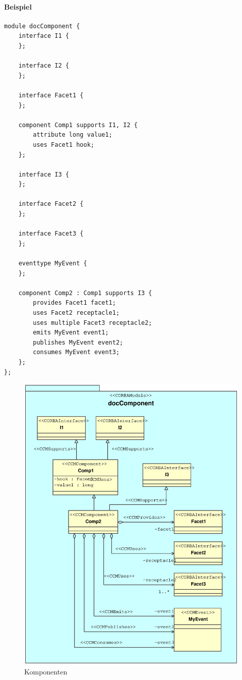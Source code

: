 \documentclass [a4paper,10pt] {scrartcl}
\begin{document}
\paragraph{Beispiel}
\begin{verbatim}
module docComponent {
    interface I1 {
    };

    interface I2 {
    };

    interface Facet1 {
    };

    component Comp1 supports I1, I2 {
        attribute long value1;
        uses Facet1 hook;
    };

    interface I3 {
    };

    interface Facet2 {
    };

    interface Facet3 {
    };

    eventtype MyEvent {
    };

    component Comp2 : Comp1 supports I3 {
        provides Facet1 facet1;
        uses Facet2 receptacle1;
        uses multiple Facet3 receptacle2;
        emits MyEvent event1;
        publishes MyEvent event2;
        consumes MyEvent event3;
    };
};
\end{verbatim}
\begin{figure}[!h]
\centerline{\includegraphics[width=\linewidth]{docComponent.eps}}
\caption{Komponenten}
\label{fig:component}
\end{figure}
\end{document}
